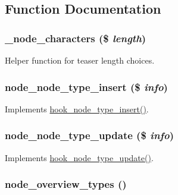 \subsection{Function Documentation}
\hypertarget{content__types_8inc_a7b6024b1fb2150c608e182b317063a97}{
\subsubsection[{\_\-node\_\-characters}]{\setlength{\rightskip}{0pt plus 5cm}\_\-node\_\-characters (\$ {\em length})}}
\label{content__types_8inc_a7b6024b1fb2150c608e182b317063a97}
Helper function for teaser length choices. \hypertarget{content__types_8inc_a0386f57120ddb9f4b77987aa146264cc}{
\subsubsection[{node\_\-node\_\-type\_\-insert}]{\setlength{\rightskip}{0pt plus 5cm}node\_\-node\_\-type\_\-insert (\$ {\em info})}}
\label{content__types_8inc_a0386f57120ddb9f4b77987aa146264cc}
Implements \hyperlink{group__hooks_ga8941b418846350a7edbd67ac388a5dfb}{hook\_\-node\_\-type\_\-insert()}. \hypertarget{content__types_8inc_a88bebabb9aa889ff6ec845b08a340b30}{
\subsubsection[{node\_\-node\_\-type\_\-update}]{\setlength{\rightskip}{0pt plus 5cm}node\_\-node\_\-type\_\-update (\$ {\em info})}}
\label{content__types_8inc_a88bebabb9aa889ff6ec845b08a340b30}
Implements \hyperlink{group__hooks_ga7518f336bfbd131259f520fcd45ba710}{hook\_\-node\_\-type\_\-update()}. \hypertarget{content__types_8inc_a9530bf9d596b557e8c77f196960dde84}{
\subsubsection[{node\_\-overview\_\-types}]{\setlength{\rightskip}{0pt plus 5cm}node\_\-overview\_\-types ()}}
